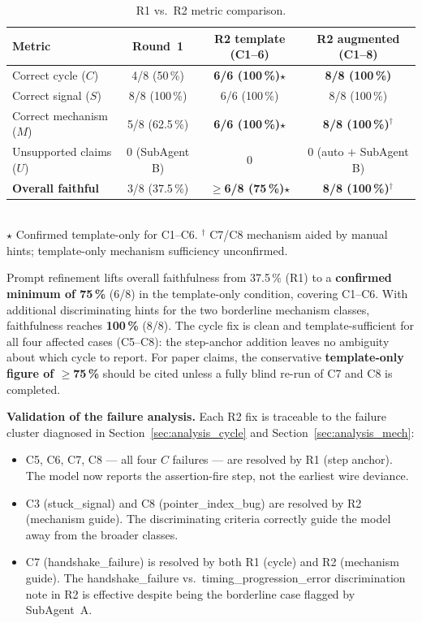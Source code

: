 \documentclass[11pt,a4paper]{article}
\newcommand{\killed}[1]{\textcolor{killgreen}{\textbf{#1}}}
\begin{document}
\begin{table}[H]
\centering
\caption{R1 vs.\ R2 metric comparison.}
\label{tab:r1_r2_comparison}
\begin{tabular}{lccc}
\toprule
\textbf{Metric} & \textbf{Round~1} & \textbf{R2 template (C1--6)} & \textbf{R2 augmented (C1--8)} \\
\midrule
Correct cycle ($C$)      & 4/8 (50\,\%)   & \killed{6/6 (100\,\%)}$\star$ & \killed{8/8 (100\,\%)} \\
Correct signal ($S$)     & 8/8 (100\,\%) & 6/6 (100\,\%) & 8/8 (100\,\%) \\
Correct mechanism ($M$)  & 5/8 (62.5\,\%) & \killed{6/6 (100\,\%)}$\star$ & \killed{8/8 (100\,\%)}$^{\dagger}$ \\
Unsupported claims ($U$) & 0 (SubAgent B) & 0 & 0 (auto $+$ SubAgent B) \\
\textbf{Overall faithful} & 3/8 (37.5\,\%) & \killed{\textbf{$\geq$6/8 (75\,\%)}}$\star$ & \killed{\textbf{8/8 (100\,\%)}}$^{\dagger}$ \\
\bottomrule
\end{tabular}
\smallskip\\
{$\star$ Confirmed template-only for C1--C6.\quad
$^{\dagger}$ C7/C8 mechanism aided by manual hints; template-only mechanism sufficiency unconfirmed.}
\end{table}

\noindent Prompt refinement lifts overall faithfulness from 37.5\,\% (R1) to a
\textbf{confirmed minimum of 75\,\%} (6/8) in the template-only condition, covering
C1--C6. With additional discriminating hints for the two borderline mechanism classes,
faithfulness reaches \textbf{100\,\%} (8/8). The cycle fix is clean and
template-sufficient for all four affected cases (C5--C8): the step-anchor addition
leaves no ambiguity about which cycle to report. For paper claims, the conservative
\textbf{template-only figure of $\geq$75\,\%} should be cited unless a fully blind
re-run of C7 and C8 is completed.

\textbf{Validation of the failure analysis.} Each R2 fix is traceable to the
failure cluster diagnosed in Section~\ref{sec:analysis_cycle} and
Section~\ref{sec:analysis_mech}:
\begin{itemize}
  \item C5, C6, C7, C8 --- all four $C$ failures --- are resolved by R1 (step
    anchor). The model now reports the assertion-fire step, not the earliest
    wire deviance.
  \item C3 (stuck\_signal) and C8 (pointer\_index\_bug) are resolved by R2
    (mechanism guide). The discriminating criteria correctly guide the model
    away from the broader classes.
  \item C7 (handshake\_failure) is resolved by both R1 (cycle) and R2 (mechanism
    guide). The handshake\_failure vs.\ timing\_progression\_error discrimination
    note in R2 is effective despite being the borderline case flagged by
    SubAgent~A.
\end{itemize}
\end{document}

